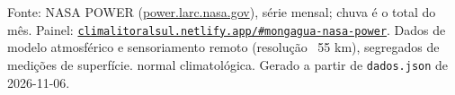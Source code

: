 \documentclass[10pt,a4paper]{article}
\begin{document}
\vspace{1pt}
{\tiny\color{cinza}
Fonte: NASA POWER (\href{https://power.larc.nasa.gov}{power.larc.nasa.gov}), série mensal;
chuva é o total do mês. Painel:
\href{https://climalitoralsul.netlify.app/\#mongagua-nasa-power}%
{\texttt{climalitoralsul.netlify.app/\#mongagua-nasa-power}}.
Dados de modelo atmosférico e sensoriamento remoto (resolução ~55 km), segregados de medições de superfície. 
normal climatológica.
Gerado a partir de \texttt{dados.json} de 2026-11-06.}
\end{document}
